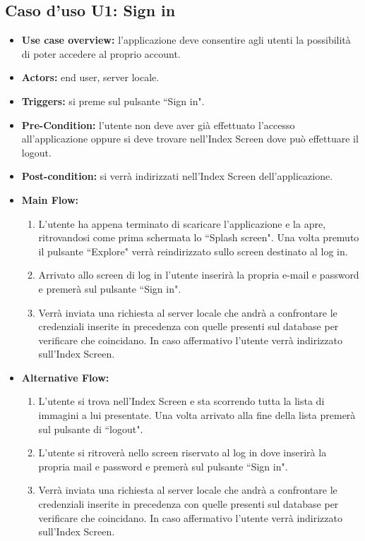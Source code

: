 \subsection*{Caso d'uso U1: Sign in}
\begin{itemize}
    \item  \textbf{Use case overview:} l'applicazione deve consentire agli utenti la possibilit\`a di poter accedere al proprio account.
    \item \textbf{Actors:} end user, server locale.
    \item \textbf{Triggers:} si preme sul pulsante ``Sign in".
    \item \textbf{Pre-Condition:} l'utente non deve aver gi\`a effettuato l'accesso all'applicazione oppure si deve trovare nell'Index Screen dove pu\`o effettuare il logout.
    \item \textbf{Post-condition:} si verr\`a indirizzati nell'Index Screen dell'applicazione.
    \item \textbf{Main Flow:} \begin{enumerate}
              \item L'utente ha appena terminato di scaricare l'applicazione e la apre, ritrovandosi come prima schermata lo ``Splash screen". Una volta premuto il pulsante ``Explore" verr\`a reindirizzato sullo screen destinato al log in.
              \item Arrivato allo screen di log in l'utente inserir\`a la propria e-mail e password e premer\`a sul pulsante ``Sign in".
              \item Verr\`a inviata una richiesta al server locale che andr\`a a confrontare le credenziali inserite in precedenza con quelle presenti sul database per verificare che coincidano. In caso affermativo l'utente verr\`a indirizzato sull'Index Screen.

          \end{enumerate}
    \item \textbf{Alternative Flow:}\begin{enumerate}
              \item L'utente si trova nell'Index Screen e sta scorrendo tutta la lista di immagini a lui presentate. Una volta arrivato alla fine della lista premer\`a sul pulsante di ``logout".
              \item L'utente si ritrover\`a nello screen riservato al log in dove inserir\`a la propria mail e password e premer\`a sul pulsante ``Sign in".
              \item Verr\`a inviata una richiesta al server locale che andr\`a a confrontare le credenziali inserite in precedenza con quelle presenti sul database per verificare che coincidano. In caso affermativo l'utente verr\`a indirizzato sull'Index Screen.
          \end{enumerate}


\end{itemize}

